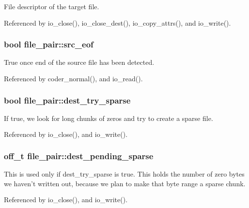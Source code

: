 File descriptor of the target file. 



Referenced by io\-\_\-close(), io\-\_\-close\-\_\-dest(), io\-\_\-copy\-\_\-attrs(), and io\-\_\-write().

\subsubsection[{src\-\_\-eof}]{\setlength{\rightskip}{0pt plus 5cm}bool file\-\_\-pair\-::src\-\_\-eof}\label{structfile__pair_afee08cdab4c8f19e0734a6da48e21921}


True once end of the source file has been detected. 



Referenced by coder\-\_\-normal(), and io\-\_\-read().

\subsubsection[{dest\-\_\-try\-\_\-sparse}]{\setlength{\rightskip}{0pt plus 5cm}bool file\-\_\-pair\-::dest\-\_\-try\-\_\-sparse}\label{structfile__pair_a0267a1a379d041c2c4dbf6db1035a20c}
If true, we look for long chunks of zeros and try to create a sparse file. 

Referenced by io\-\_\-close(), and io\-\_\-write().

\subsubsection[{dest\-\_\-pending\-\_\-sparse}]{\setlength{\rightskip}{0pt plus 5cm}off\-\_\-t file\-\_\-pair\-::dest\-\_\-pending\-\_\-sparse}\label{structfile__pair_a8372ad2043ad566b72c2743bd42bbe22}
This is used only if dest\-\_\-try\-\_\-sparse is true. This holds the number of zero bytes we haven't written out, because we plan to make that byte range a sparse chunk. 

Referenced by io\-\_\-close(), and io\-\_\-write().

